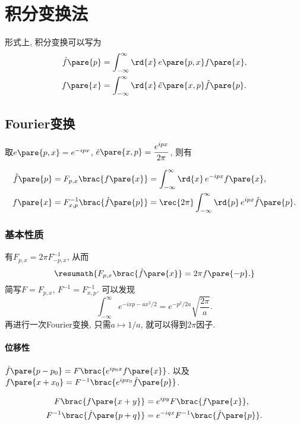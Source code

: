 \documentclass[hidelinks]{ctexart}
\begin{document}
\section{积分变换法} %
\label{sec:积分变换法}

形式上, 积分变换可以写为
\begin{align*}
    \hat f\pare{p} &= \int_{-\infty}^\infty \rd{x}\,e\pare{p,x} f\pare{x}, \\
    f\pare{x} &= \int_{-\infty}^\infty \rd{x}\,\hat{e}\pare{x,p}\hat f\pare{p}.
\end{align*}

\subsection{Fourier变换} %
\label{sub:fourier变换}

取$e\pare{p,x} = e^{-ipx}$, $\displaystyle \hat e\pare{x,p} = \frac{e^{ipx}}{2\pi}$, 则有
\begin{resume}
\vspace{-\baselineskip}
\begin{align*}
    \hat f\pare{p} &= F_{p,x}\brac{f\pare{x}} = \int_{-\infty}^\infty \rd{x}\, e^{-ipx} f\pare{x}, \\
    f\pare{x} &= F^{-1}_{x,p}\brac{\hat f\pare{p}} = \rec{2\pi}\int_{-\infty}^{\infty}\rd{p}\, e^{ipx}\hat f\pare{p}.
\end{align*}
\end{resume}

\subsubsection{基本性质} %
\label{ssub:基本性质}

有$F_{p,x} = 2\pi F_{-p,x}^{-1}$, 从而
\[ \resumath{F_{p,x}\brac{\hat f\pare{x}} = 2\pi f\pare{-p}.} \]
简写$F=F_{p,x}$, $F^{-1} = F_{x,p}^{-1}$. 可以发现
\[ \int_{-\infty}^\infty e^{-ixp - ax^2/2} = e^{-p^2/2a} \sqrt{\frac{2\pi}{a}}. \]
再进行一次Fourier变换, 只需$a\mapsto 1/a$, 就可以得到$2\pi$因子.

\paragraph{位移性} %
\label{par:位移性}

$\hat f\pare{p-p_0} = F\brac{e^{ip_0 x}f\pare{x}}$. 以及$f\pare{x+x_0} = F^{-1}\brac{e^{ipx_0}\hat f\pare{p}}$.
\begin{resume}
\vspace{-\baselineskip}
\begin{align*}
    F\brac{f\pare{x+y}} &= e^{ipy}F\brac{f\pare{x}}, \\
    F^{-1}\brac{\hat f\pare{p+q}} &= e^{-iqx}F^{-1}\brac{\hat f\pare{p}}.
\end{align*}
\end{resume}
\end{document}

